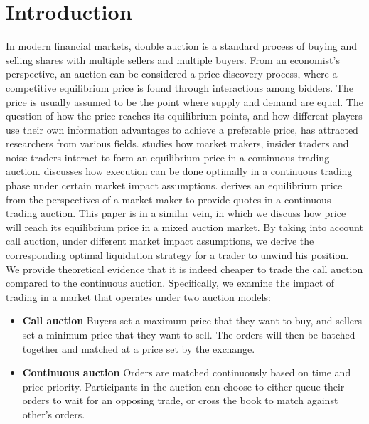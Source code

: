\documentclass{article}
\begin{document}
\section{Introduction}
In modern financial markets, double auction is a standard process of buying and selling shares with multiple sellers and multiple buyers. From an economist's perspective, an auction can be considered a price discovery process, where a competitive equilibrium price is found through interactions among bidders. The price is usually assumed to be the point where supply and demand are equal. The question of how the price reaches its equilibrium points, and how different players use their own information advantages to achieve a preferable price, has attracted researchers from various fields. \cite{Kyle1985} studies how market makers, insider traders and noise traders interact to form an equilibrium price in a continuous trading auction. \cite{AlmgrenChriss2000} discusses how execution can be done optimally in a continuous trading phase under certain market impact assumptions. \cite{Avellaneda2008} derives an equilibrium price from the perspectives of a market maker to provide quotes in a continuous trading auction. This paper is in a similar vein, in which we discuss how price will reach its equilibrium price in a mixed auction market. By taking into account call auction, under different market impact assumptions, we derive the corresponding optimal liquidation strategy for a trader to unwind his position. We provide theoretical evidence that it is indeed cheaper to trade the call auction compared to the continuous auction. Specifically, we examine the impact of trading in a market that operates under two auction models:
\begin{itemize}
  \item \textbf{Call auction} Buyers set a maximum price that they want to buy, and sellers set a minimum price that they want to sell. The orders will then be batched together and matched at a price set by the exchange.
  \item \textbf{Continuous auction} Orders are matched continuously based on time and price priority. Participants in the auction can choose to either queue their orders to wait for an opposing trade, or cross the book to match against other's orders.
\end{itemize}
\end{document}
